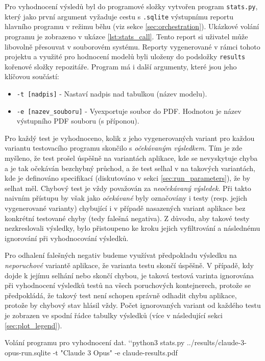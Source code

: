 \documentclass[czech, ma, kiv, he, iso690alph, pdf, viewonly]{fasthesis}
\begin{document}
        Pro vyhodnocení výsledů byl do programové složky vytvořen program \verb|stats.py|, který jako první argument vyžaduje cestu s \verb|.sqlite| výstupnímu reportu hlavního programu v režimu běhu (viz sekce \ref{sec:orchestration}). Ukázkové volání programu je zobrazeno v ukázce \ref{lst:stats_call}. Tento report si uživatel může libovolně přesouvat v souborovém systému. Reporty vygenerované v rámci tohoto projektu a využité pro hodnocení modelů byli uloženy do podsložky \verb|results| kořenové složky repozitáře. Program má i další argumenty, které jsou jeho klíčovou součástí:
        \begin{itemize}
            \item \verb|-t [nadpis]| - Nastaví nadpis nad tabulkou (název modelu).
            \item \verb|-e [nazev_souboru]| - Vyexportuje soubor do PDF. Hodnotou je název výstupního PDF souboru (s příponou).
        \end{itemize}
        Pro každý test je vyhodnoceno, kolik z jeho vygenerovaných variant pro každou variantu testovacího programu skončilo s \textit{očekávaným výsledkem}. Tím je zde myšleno, že test prošel úspěšně na variantách aplikace, kde se nevyskytuje chyba a je tak očekáván bezchybný průchod, a že test selhal v na takových variantách, kde je definováno specifikací (diskutováno v sekci \ref{sec:run_parameters}), že by selhat měl. Chybový test je vždy považován za \textit{neočekávaný výsledek}. Při takto naivním přístupu by však jako \emph{očekávané} byly označovány i testy (resp. jejich vygenerované varianty) chybující i v případě nasazených variant aplikace bez konkrétní testované chyby (tedy falešná negativa). Z důvodu, aby takové testy nezkreslovali výsledky, bylo přistoupeno ke kroku jejich vyfiltrování a následnému ignorování při vyhodnocování výsledků.

        Pro odhalení falešných negativ budeme využívat předpokladu výsledku na \emph{neporuchové} variantě aplikace, že varianta testu skončí úspěšně. V případě, kdy dojde k jejímu selhání nebo skončí chybou, je taková testová varinta ignorována při vyhodnocení výsledků testů na všech poruchových kontejnerech, protože se předpokládá, že takový test není schopen správně odhadit chybu aplikace, protože by chybový stav hlásil vždy. Počet ignorovaných variant od každého testu je zobrazen ve spodní řádce tabulky výsledků (více v následující sekci \ref{sec:plot_legend}).

        \begin{console}{Volání programu pro vyhodnocení dat. \label{lst:stats_call}}
`\uxprompt`python3 stats.py ../results/claude-3-opus-run.sqlite -t "Claude 3 Opus" -e claude-results.pdf
        \end{console}
\end{document}
